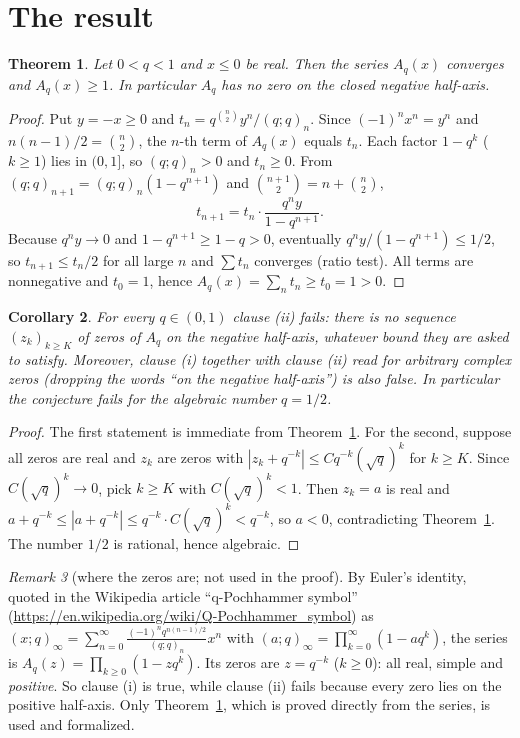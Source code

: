 \documentclass[11pt]{article}
\newtheorem{theorem}{Theorem}
\newtheorem{corollary}[theorem]{Corollary}
\theoremstyle{definition}
\theoremstyle{remark}
\newtheorem{remark}[theorem]{Remark}
\renewcommand{\_}{\oldus\allowbreak}
\begin{document}
\section{The result}

\begin{theorem}\label{thm:key}
Let $0<q<1$ and $x\le 0$ be real. Then the series $A_q(x)$ converges and $A_q(x)\ge 1$. In particular
$A_q$ has no zero on the closed negative half-axis.
\end{theorem}

\begin{proof}
Put $y=-x\ge 0$ and $t_n=q^{\binom n2}y^n/(q;q)_n$. Since $(-1)^nx^n=y^n$ and $n(n-1)/2=\binom n2$, the
$n$-th term of $A_q(x)$ equals $t_n$. Each factor $1-q^k$ ($k\ge 1$) lies in $(0,1]$, so $(q;q)_n>0$ and
$t_n\ge 0$. From $(q;q)_{n+1}=(q;q)_n(1-q^{n+1})$ and $\binom{n+1}{2}=n+\binom n2$,
\[ t_{n+1}=t_n\cdot\frac{q^n y}{1-q^{n+1}} . \]
Because $q^ny\to 0$ and $1-q^{n+1}\ge 1-q>0$, eventually $q^ny/(1-q^{n+1})\le 1/2$, so
$t_{n+1}\le t_n/2$ for all large $n$ and $\sum t_n$ converges (ratio test). All terms are nonnegative and
$t_0=1$, hence $A_q(x)=\sum_n t_n\ge t_0=1>0$.
\end{proof}

\begin{corollary}\label{cor:main}
For every $q\in(0,1)$ clause (ii) fails: there is no sequence $(z_k)_{k\ge K}$ of zeros of $A_q$ on the
negative half-axis, whatever bound they are asked to satisfy. Moreover, clause (i) together with
clause (ii) read for arbitrary complex zeros (dropping the words ``on the negative half-axis'') is also
false. In particular the conjecture fails for the algebraic number $q=1/2$.
\end{corollary}

\begin{proof}
The first statement is immediate from Theorem~\ref{thm:key}. For the second, suppose all zeros are real
and $z_k$ are zeros with $|z_k+q^{-k}|\le Cq^{-k}(\sqrt q)^k$ for $k\ge K$. Since $C(\sqrt q)^k\to 0$,
pick $k\ge K$ with $C(\sqrt q)^k<1$. Then $z_k=a$ is real and
$a+q^{-k}\le |a+q^{-k}|\le q^{-k}\cdot C(\sqrt q)^k<q^{-k}$, so $a<0$, contradicting
Theorem~\ref{thm:key}. The number $1/2$ is rational, hence algebraic.
\end{proof}

\begin{remark}[where the zeros are; not used in the proof]
By Euler's identity, quoted in the Wikipedia article ``q-Pochhammer symbol''
(\url{https://en.wikipedia.org/wiki/Q-Pochhammer_symbol}) as
$(x;q)_\infty=\sum_{n=0}^{\infty}\frac{(-1)^nq^{n(n-1)/2}}{(q;q)_n}x^n$ with
$(a;q)_\infty=\prod_{k=0}^{\infty}(1-aq^k)$, the series is $A_q(z)=\prod_{k\ge0}(1-zq^k)$. Its zeros are
$z=q^{-k}$ ($k\ge 0$): all real, simple and \emph{positive}. So clause (i) is true, while clause (ii)
fails because every zero lies on the positive half-axis. Only Theorem~\ref{thm:key}, which is proved
directly from the series, is used and formalized.
\end{remark}
\end{document}
